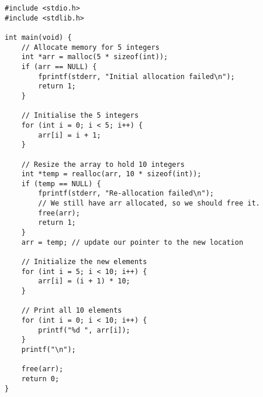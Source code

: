 \documentclass[a4paper,12pt]{article}
\begin{document}
\begin{center}
\end{center}
\hrulefill

\newpage

\begin{lstlisting}[caption=Full example of dynamic memory usage]
#include <stdio.h>
#include <stdlib.h>

int main(void) {
    // Allocate memory for 5 integers
    int *arr = malloc(5 * sizeof(int));
    if (arr == NULL) {
        fprintf(stderr, "Initial allocation failed\n");
        return 1;
    }

    // Initialise the 5 integers
    for (int i = 0; i < 5; i++) {
        arr[i] = i + 1;
    }

    // Resize the array to hold 10 integers
    int *temp = realloc(arr, 10 * sizeof(int));
    if (temp == NULL) {
        fprintf(stderr, "Re-allocation failed\n");
        // We still have arr allocated, so we should free it.
        free(arr);
        return 1;
    }
    arr = temp; // update our pointer to the new location

    // Initialize the new elements
    for (int i = 5; i < 10; i++) {
        arr[i] = (i + 1) * 10;
    }

    // Print all 10 elements
    for (int i = 0; i < 10; i++) {
        printf("%d ", arr[i]);
    }
    printf("\n");

    free(arr);
    return 0;
}
\end{lstlisting}
\end{document}
